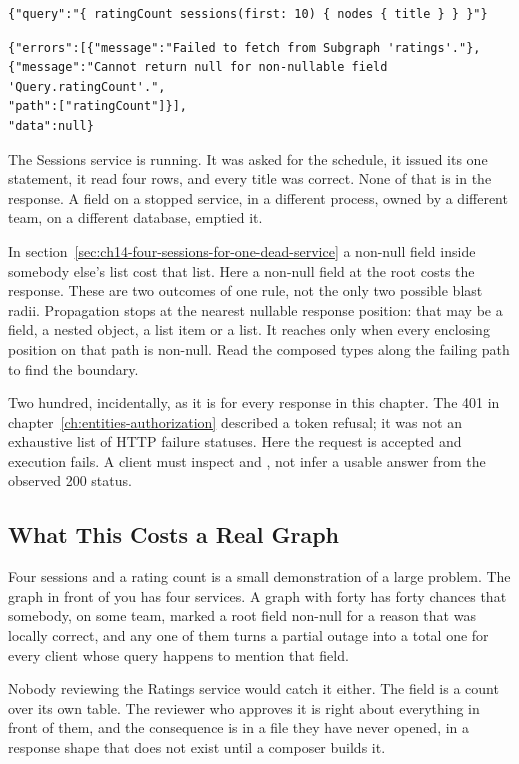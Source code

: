 \begin{verbatim}
{"query":"{ ratingCount sessions(first: 10) { nodes { title } } }"}
\end{verbatim}

\begin{verbatim}
{"errors":[{"message":"Failed to fetch from Subgraph 'ratings'."},
{"message":"Cannot return null for non-nullable field 'Query.ratingCount'.",
"path":["ratingCount"]}],
"data":null}
\end{verbatim}

%
The Sessions service is running. It was asked for the schedule, it issued its
one statement, it read four rows, and every title was correct. None of that is
in the response. A field on a stopped service, in a different process, owned by
a different team, on a different database, emptied it.

%
In section~\ref{sec:ch14-four-sessions-for-one-dead-service} a non-null field
inside somebody else's list cost that list. Here a non-null field at the root
costs the response. These are two outcomes of one rule, not the only two
possible blast radii. Propagation stops at the nearest nullable response
position: that may be a field, a nested object, a list item or a list. It
reaches  only when every enclosing position on that path is
non-null. Read the composed types along the failing path to find the boundary.

%
Two hundred, incidentally, as it is for every response in this chapter. The
401 in chapter~\ref{ch:entities-authorization} described a token refusal;
it was not an exhaustive list of HTTP failure statuses. Here the request is
accepted and execution fails. A client must inspect  and
, not infer a usable answer from the observed 200 status.

\subsection{What This Costs a Real Graph}

%
Four sessions and a rating count is a small demonstration of a large problem.
The graph in front of you has four services. A graph with forty has forty
chances that somebody, on some team, marked a root field non-null for a reason
that was locally correct, and any one of them turns a partial outage into a
total one for every client whose query happens to mention that field.

%
Nobody reviewing the Ratings service would catch it either. The field is a
count over its own table. The reviewer who approves it is right about
everything in front of them, and the consequence is in a file they have never
opened, in a response shape that does not exist until a composer builds it.
%
